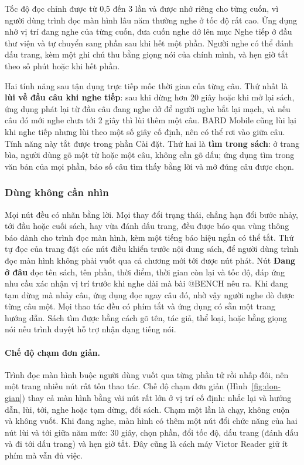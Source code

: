 \documentclass[12pt,a4paper]{article}
\begin{document}
Tốc độ đọc chỉnh được từ 0,5 đến 3 lần và được nhớ riêng cho từng cuốn, vì người dùng trình đọc màn hình lâu năm thường nghe ở tốc độ rất cao. Ứng dụng nhớ vị trí đang nghe của từng cuốn, đưa cuốn nghe dở lên mục Nghe tiếp ở đầu thư viện và tự chuyển sang phần sau khi hết một phần. Người nghe có thể đánh dấu trang, kèm một ghi chú thu bằng giọng nói của chính mình, và hẹn giờ tắt theo số phút hoặc khi hết phần.

Hai tính năng sau tận dụng trực tiếp mốc thời gian của từng câu. Thứ nhất là \textbf{lùi về đầu câu khi nghe tiếp}: sau khi dừng hơn 20 giây hoặc khi mở lại sách, ứng dụng phát lại từ đầu câu đang nghe dở để người nghe bắt lại mạch, và nếu câu đó mới nghe chưa tới 2 giây thì lùi thêm một câu. BARD Mobile cũng lùi lại khi nghe tiếp nhưng lùi theo một số giây cố định, nên có thể rơi vào giữa câu. Tính năng này tắt được trong phần Cài đặt. Thứ hai là \textbf{tìm trong sách}: ở trang bìa, người dùng gõ một từ hoặc một câu, không cần gõ dấu; ứng dụng tìm trong văn bản của mọi phần, báo số câu tìm thấy bằng lời và mở đúng câu được chọn.

\subsubsection{Dùng không cần nhìn}

Mọi nút đều có nhãn bằng lời. Mọi thay đổi trạng thái, chẳng hạn đổi bước nhảy, tới đầu hoặc cuối sách, hay vừa đánh dấu trang, đều được báo qua vùng thông báo dành cho trình đọc màn hình, kèm một tiếng báo hiệu ngắn có thể tắt. Thứ tự đọc của trang đặt các nút điều khiển trước nội dung sách, để người dùng trình đọc màn hình không phải vuốt qua cả chương mới tới được nút phát. Nút \textbf{Đang ở đâu} đọc tên sách, tên phần, thời điểm, thời gian còn lại và tốc độ, đáp ứng nhu cầu xác nhận vị trí trước khi nghe dài mà bài @BENCH nêu ra. Khi đang tạm dừng mà nhảy câu, ứng dụng đọc ngay câu đó, nhờ vậy người nghe dò được từng câu một. Mọi thao tác đều có phím tắt và ứng dụng có sẵn một trang hướng dẫn. Sách tìm được bằng cách gõ tên, tác giả, thể loại, hoặc bằng giọng nói nếu trình duyệt hỗ trợ nhận dạng tiếng nói.

\paragraph{Chế độ chạm đơn giản.} Trình đọc màn hình buộc người dùng vuốt qua từng phần tử rồi nhấp đôi, nên một trang nhiều nút rất tốn thao tác. Chế độ chạm đơn giản (Hình~\ref{fig:don-gian}) thay cả màn hình bằng vài nút rất lớn ở vị trí cố định: nhắc lại và hướng dẫn, lùi, tới, nghe hoặc tạm dừng, đổi sách. Chạm một lần là chạy, không cuộn và không vuốt. Khi đang nghe, màn hình có thêm một nút đổi chức năng của hai nút lùi và tới giữa năm mức: 30 giây, chọn phần, đổi tốc độ, dấu trang (đánh dấu và đi tới dấu trang) và hẹn giờ tắt. Đây cũng là cách máy Victor Reader giữ ít phím mà vẫn đủ việc.
\end{document}
